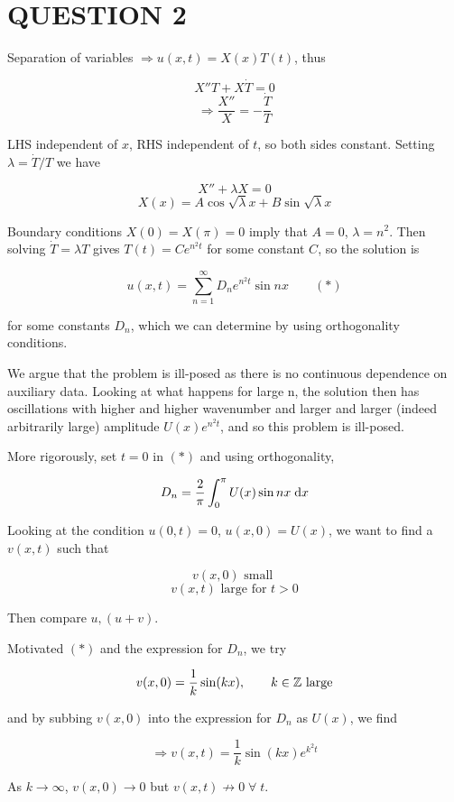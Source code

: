\documentclass[a4paper]{article}
\begin{document}
\section{QUESTION 2}

Separation of variables $ \Rightarrow u(x,t) = X(x) T(t) $, thus

\[ X''T + X \dot{T} = 0 \]
\[ \Rightarrow \frac{X''}{X} = - \frac{\dot{T}}{T}  \]

LHS independent of $ x $, RHS independent of $ t $, so both sides constant.
Setting $ \lambda = \dot{T} / T $ we have

\[ X'' + \lambda X = 0 \]
\[ X(x) = A \cos \sqrt{\lambda} x + B \sin \sqrt{\lambda} x \]

Boundary conditions $ X(0) = X(\pi) = 0 $ imply that $ A = 0 $, $ \lambda = n^{2} $. Then solving $ \dot{T} = \lambda T $ gives $ T(t) = C e^{n^{2} t} $ for some constant $ C $, so the solution is 

\[ u(x,t) = \sum_{n=1}^{\infty} D_{n} e^{n^{2}t} \sin n x \qquad (*)  \]

for some constants $ D_{n} $, which we can determine by using orthogonality conditions. 

We argue that the problem is ill-posed as there is no continuous dependence on auxiliary data. Looking at what happens for large n, the solution then has oscillations with higher and higher wavenumber and larger and larger (indeed arbitrarily large) amplitude $ U(x) e^{n^{2}t} $, and so this problem is ill-posed.

More rigorously, set $ t = 0 $ in $ (*) $ and using orthogonality,

\[ D_{n} = \frac{2}{\pi} \int_{0}^{\pi} U(x) \sin n x  \; \mathrm{d} x \]

Looking at the condition $ u(0,t) = 0 $, $ u(x,0) = U(x) $, we want to find a $ v(x,t) $ such that 

\[ v(x,0) \text{ small } \]
\[ v(x,t) \text{ large for } t > 0  \]

Then compare $ u,(u+v) $.

Motivated $ (*) $ and the expression for $ D_{n} $, we try 

\[ v(x,0) = \frac{1}{k} \sin(kx), \qquad k \in \mathbb{Z} \text{ large} \]

and by subbing $ v(x,0) $ into the expression for $ D_{n} $ as $ U(x) $, we find

\[ \Rightarrow v(x,t) = \frac{1}{k} \sin(kx) e^{k^{2} t}  \]

As $ k \to \infty $, $ v(x,0) \to 0  $ but $ v(x,t) \not\to 0 \; \forall \; t $.
\end{document}
